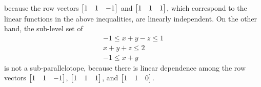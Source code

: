 because the row vectors $\left[\begin{matrix}1 & 1 &
    -1 \end{matrix}\right]$ and $\left[\begin{matrix}1 & 1 &
    1 \end{matrix}\right]$, which correspond to the linear functions in the
above inequalities, are linearly independent.  On the other hand, the
sub-level set of
%
\begin{align*}
  -1\leq x+y-z\leq 1\\
  x+y+z\leq 2\\
  -1\leq x+y
\end{align*}
%
is not a sub-parallelotope, because there is linear dependence among
the row vectors $\left[\begin{matrix} 1 & 1 & -1\end{matrix}\right]$,
$\left[\begin{matrix} 1 & 1 & 1\end{matrix}\right]$, and
$\left[\begin{matrix} 1 & 1 & 0 \end{matrix}\right]$.


